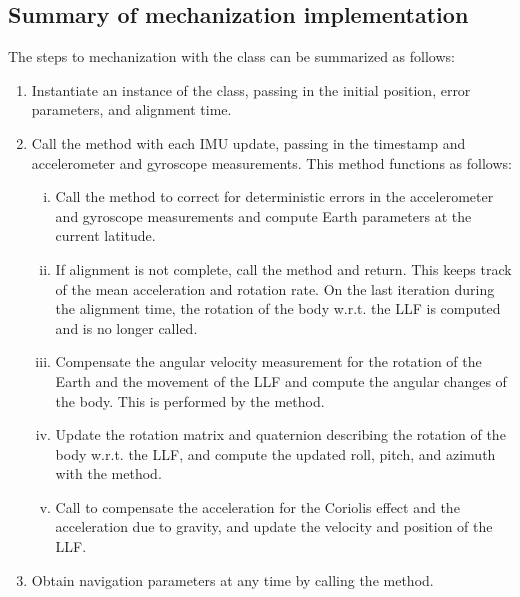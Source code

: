 \documentclass[11pt, oneside]{article}   	%
\begin{document}
\subsection{Summary of mechanization implementation}
The steps to mechanization with the  class can be summarized as follows:
\begin{enumerate}
	\item Instantiate an instance of the  class, passing in the initial position, error parameters, and alignment time.
	\item Call the  method with each IMU update, passing in the timestamp and accelerometer and gyroscope measurements.  This method functions as follows:
	\begin{enumerate}[i.]
		\item Call the  method to correct for deterministic errors in the accelerometer and gyroscope measurements and compute Earth parameters at the current latitude.
		\item If alignment is not complete, call the  method and return. This keeps track of the mean acceleration and rotation rate. On the last iteration during the alignment time, the rotation of the body w.r.t. the LLF is computed and  is no longer called.
		\item Compensate the angular velocity measurement for the rotation of the Earth and the movement of the LLF and compute the angular changes of the body.  This is performed by the  method.
		\item Update the rotation matrix and quaternion describing the rotation of the body w.r.t. the LLF, and compute the updated roll, pitch, and azimuth with the  method.
		\item Call  to compensate the acceleration for the Coriolis effect and the acceleration due to gravity, and update the velocity and position of the LLF.
	\end{enumerate}
	\item Obtain navigation parameters at any time by calling the  method.
\end{enumerate}
\end{document}
